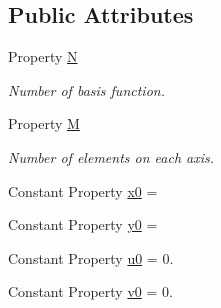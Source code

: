 \subsection*{Public Attributes}
\begin{DoxyCompactItemize}
\item 
Property \hyperlink{class_const_adv_uniform_mesh2d_a4fe5c3963150d921550e7041efde62af}{N}
\begin{DoxyCompactList}\small\item\em Number of basis function. \end{DoxyCompactList}\item 
Property \hyperlink{class_const_adv_uniform_mesh2d_a1bbfe1ed756e54d1ed72c02f39ac433c}{M}
\begin{DoxyCompactList}\small\item\em Number of elements on each axis. \end{DoxyCompactList}\item 
Constant Property \hyperlink{class_const_adv_uniform_mesh2d_ae12f0a62657c2b190b7ee3a1d7955e51}{x0} =
\item 
Constant Property \hyperlink{class_const_adv_uniform_mesh2d_a3ba507bf5e834f67416624de441761ef}{y0} =
\item 
Constant Property \hyperlink{class_const_adv_uniform_mesh2d_a0fbf7d63bcb89093f7e3920152068055}{u0} = 0.
\item 
Constant Property \hyperlink{class_const_adv_uniform_mesh2d_a5d023ca6c9dbc2a84d2f461e1994fed2}{v0} = 0.
\end{DoxyCompactItemize}
